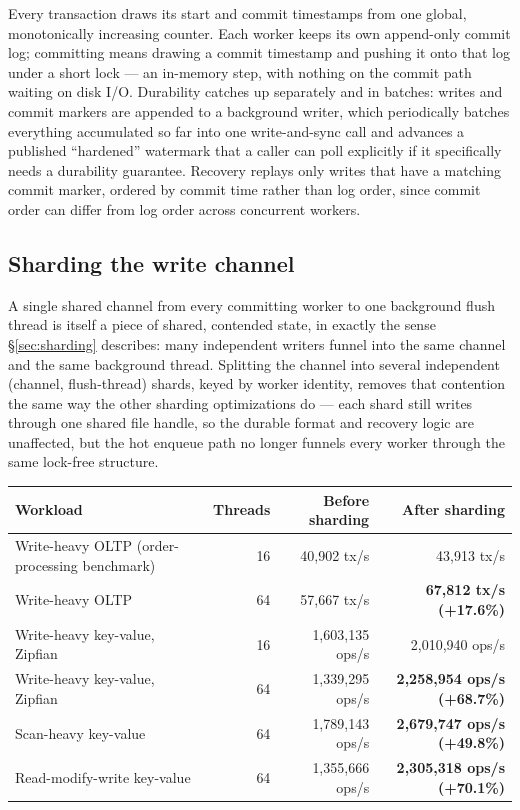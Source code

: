 \documentclass[11pt]{article}
\begin{document}
Every transaction draws its start and commit timestamps from one global,
monotonically increasing counter. Each worker keeps its own append-only commit log;
committing means drawing a commit timestamp and pushing it onto that log under a
short lock --- an in-memory step, with nothing on the commit path waiting on disk
I/O. Durability catches up separately and in batches: writes and commit markers are
appended to a background writer, which periodically batches everything accumulated
so far into one write-and-sync call and advances a published ``hardened'' watermark
that a caller can poll explicitly if it specifically needs a durability guarantee.
Recovery replays only writes that have a matching commit marker, ordered by commit
time rather than log order, since commit order can differ from log order across
concurrent workers.

\subsection{Sharding the write channel}

A single shared channel from every committing worker to one background flush
thread is itself a piece of shared, contended state, in exactly the sense
\S\ref{sec:sharding} describes: many independent writers funnel into the same
channel and the same background thread. Splitting the channel into several
independent (channel, flush-thread) shards, keyed by worker identity, removes that
contention the same way the other sharding optimizations do --- each shard still
writes through one shared file handle, so the durable format and recovery logic are
unaffected, but the hot enqueue path no longer funnels every worker through the same
lock-free structure.

\begin{center}
\begin{tabular}{lrrr}
\toprule
Workload & Threads & Before sharding & After sharding \\
\midrule
Write-heavy OLTP (order-processing benchmark) & 16 & 40,902 tx/s & 43,913 tx/s \\
Write-heavy OLTP & 64 & 57,667 tx/s & \textbf{67,812 tx/s (+17.6\%)} \\
Write-heavy key-value, Zipfian & 16 & 1,603,135 ops/s & 2,010,940 ops/s \\
Write-heavy key-value, Zipfian & 64 & 1,339,295 ops/s & \textbf{2,258,954 ops/s (+68.7\%)} \\
Scan-heavy key-value & 64 & 1,789,143 ops/s & \textbf{2,679,747 ops/s (+49.8\%)} \\
Read-modify-write key-value & 64 & 1,355,666 ops/s & \textbf{2,305,318 ops/s (+70.1\%)} \\
\bottomrule
\end{tabular}
\end{center}
\end{document}
